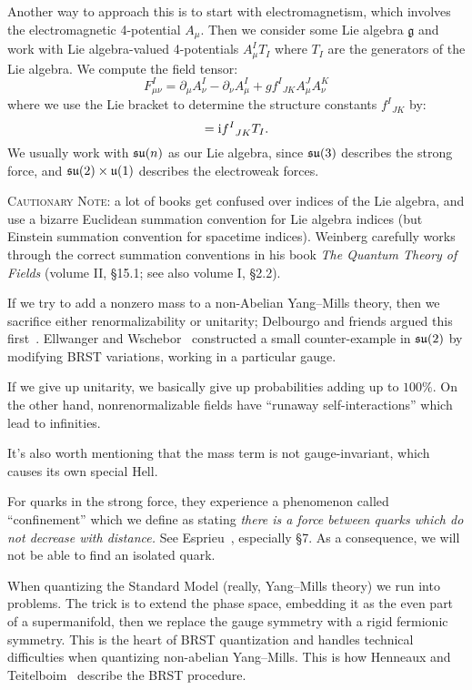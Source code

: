 Another way to approach this is to start with electromagnetism, which
involves the electromagnetic 4-potential $A_{\mu}$. Then we consider
some Lie algebra $\mathfrak{g}$ and work with Lie algebra-valued
4-potentials $A_{\mu}^{I}T_{I}$ where $T_{I}$ are the generators of the
Lie algebra. We compute the field tensor:
\begin{equation}
F_{\mu\nu}^{I} = \partial_{\mu}A^{I}_{\nu} - \partial_{\nu}A^{I}_{\mu}
+g{f^{I}}_{JK}A^{J}_{\mu}A^{K}_{\nu}
\end{equation}
where we use the Lie bracket to determine the structure constants
${f^{I}}_{JK}$ by:
\begin{equation}
[T_{J}, T_{K}] = \I {f^{I}}_{JK}T_{I}.
\end{equation}
We usually work with $\mathfrak{su}(n)$ as our Lie algebra, since $\mathfrak{su}(3)$
describes the strong force, and $\mathfrak{su}(2)\times\mathfrak{u}(1)$ describes
the electroweak forces.

\textsc{Cautionary Note}: a lot of books get confused over indices of
the Lie algebra, and use a bizarre Euclidean summation convention for
Lie algebra indices (but Einstein summation convention for spacetime
indices). Weinberg carefully works through the correct summation
conventions in his book \textit{The Quantum Theory of Fields}
(volume II, \S15.1; see also volume I, \S2.2).

If we try to add a nonzero mass to a non-Abelian Yang--Mills theory,
then we sacrifice either renormalizability or unitarity; Delbourgo and
friends argued this first~\cite{Delbourgo:1987np}.
Ellwanger and Wschebor~\cite{Ellwanger:2002sj} constructed a small
counter-example in $\mathfrak{su}(2)$ by modifying BRST variations, working in a
particular gauge.

If we give up unitarity, we basically give up probabilities adding up to
$100\%$. On the other hand, nonrenormalizable fields have ``runaway
self-interactions'' which lead to infinities.

It's also worth mentioning that the mass term is not gauge-invariant,
which causes its own special Hell.

 For quarks in the strong force, they experience a
phenomenon called ``confinement'' which we define as stating \emph{there
is a force between quarks which do not decrease with distance.} See
Esprieu~\cite{Espriu:1994br}, especially \S7. As a consequence, we will
not be able to find an isolated quark.

When quantizing the Standard Model (really, Yang--Mills theory) we run
into problems. The trick is to extend the phase space, embedding it as
the even part of a supermanifold, then we replace the gauge symmetry
with a rigid fermionic symmetry. This is the heart of BRST quantization
and handles technical difficulties when quantizing non-abelian Yang--Mills.
This is how Henneaux and Teitelboim~\cite[\S18.1]{Henneaux:1992ig}
describe the BRST procedure.
